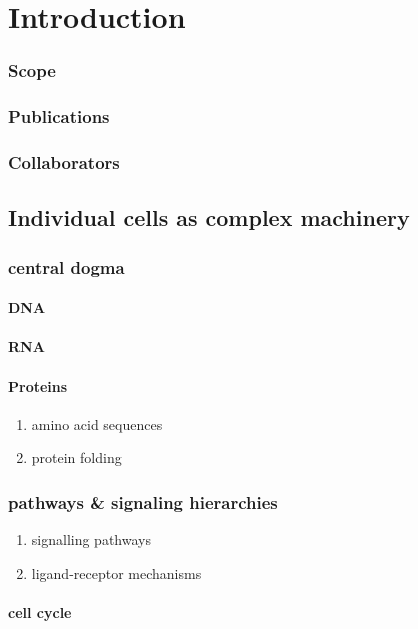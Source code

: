 \chapter{Introduction}
\subsection{Scope}
\subsection{Publications}
\subsection{Collaborators}

\section{Individual cells as complex machinery}
\subsection{central dogma}
\subsubsection{DNA}

\subsubsection{RNA}

\subsubsection{Proteins}
\begin{enumerate}
  \item amino acid sequences
  \item protein folding
\end{enumerate}

\subsection{pathways \& signaling hierarchies}
\begin{enumerate}
  \item signalling pathways
  \item ligand-receptor mechanisms
\end{enumerate}
\subsubsection{cell cycle}

